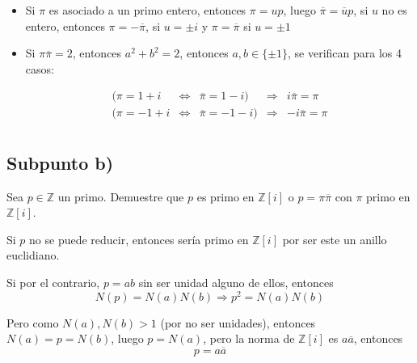 \documentclass{article}
\begin{document}
      \begin{itemize}
        \item Si $\pi$ es asociado a un primo entero, entonces $\pi = u p$, luego $\overline{\pi} = \overline{u} p$, 
              si $u$ no es entero, entonces $\pi = -\overline{\pi}$, si $u = \pm i$ y $\pi = \overline{\pi}$ 
              si $u = \pm 1$

            \item  Si $\pi \overline{\pi} = 2$, entonces $a^2 + b^2 = 2$, entonces $a, b \in \{\pm 1\}$, se verifican
                   para los 4 casos:

                   \begin{equation*}
                     \begin{aligned}
                       (\pi = 1 + i & \iff & \overline{\pi} = 1 - i) & \Rightarrow &  i\overline{\pi} = \pi \\
                       (\pi = -1 + i & \iff & \overline{\pi} = -1 - i) & \Rightarrow &  -i\overline{\pi} = \pi \\
                     \end{aligned}
                   \end{equation*}
      \end{itemize}

    \subsection{Subpunto b)}
      Sea $p \in \mathbb{Z}$ un primo. Demuestre que $p$ es primo en $\mathbb{Z}[i]$ o 
      $p = \pi \overline{\pi}$ con $\pi$ primo en $\mathbb{Z}[i]$.

      Si $p$ no se puede reducir, entonces sería primo en $\mathbb{Z}[i]$ por ser este un anillo euclidiano.


      Si por el contrario, $p = ab$ sin ser unidad alguno de ellos, entonces 
      \[
        N(p) = N(a)N(b) \Rightarrow p^2 = N(a)N(b)
      \]

      Pero como $N(a), N(b) > 1$ (por no ser unidades), entonces $N(a) = p = N(b)$, luego 
      $p = N(a)$, pero la norma de $\mathbb{Z}[i]$ es $a \overline{a}$, entonces 
      \[
        p = a \overline{a}
      \]
\end{document}
